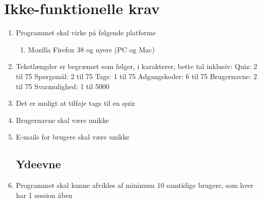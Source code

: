 \section{Ikke-funktionelle krav}
\label{sec:nonFunctional}

\begin{enumerate}
	\subsection*{Brugbarhed}
	\item Programmet skal virke på følgende platforme
	\begin{enumerate}
		\item Mozilla Firefox 38 og nyere (PC og Mac)
	\end{enumerate}
	
	\item Tekstlængder er begrænset som følger, i karakterer, bette tal inklusiv:
	\subitem Quiz: 2 til 75
	\subitem Spørgsmål: 2 til 75
	\subitem Tags: 1 til 75 
	\subitem Adgangskoder: 6 til 75
	\subitem Brugernavne: 2 til 75
	\subitem Svarmulighed: 1 til 5000
	\item Det er muligt at tilføje tags til en quiz
	\item Brugernavne skal være unikke
	\item E-mails for brugere skal være unikke
	
	\subsection*{Ydeevne}
	\item Programmet skal kunne afvikles af minimum 10 samtidige brugere, som hver har 1 session åben
\end{enumerate}